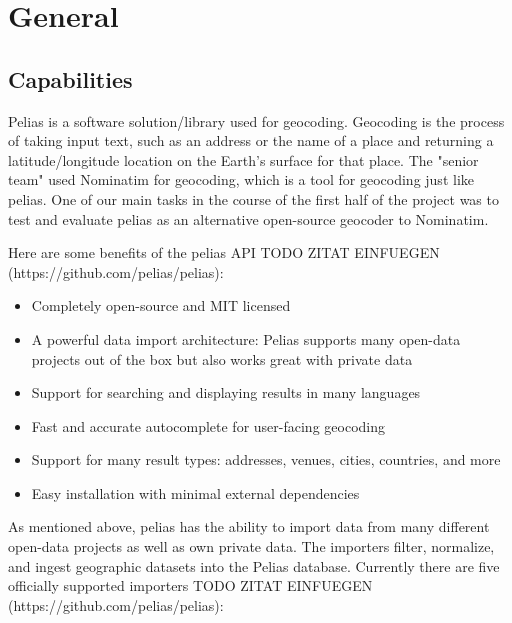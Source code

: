 

\section{General}
\subsection{Capabilities}
Pelias is a software solution/library used for geocoding. Geocoding is the process of taking input text, such as an address or the name of a place and returning a latitude/longitude location on the Earth's surface for that place.
The "senior team" used Nominatim for geocoding, which is a tool for geocoding just like pelias. One of our main tasks  in the course of the first half of the project was to test and evaluate pelias as an alternative open-source geocoder to Nominatim.

Here are some benefits of the pelias API TODO ZITAT EINFUEGEN (https://github.com/pelias/pelias):
\begin{itemize}
\item Completely open-source and MIT licensed
\item A powerful data import architecture: Pelias supports many open-data projects out of the box but also works great with private data
\item Support for searching and displaying results in many languages
\item Fast and accurate autocomplete for user-facing geocoding
\item Support for many result types: addresses, venues, cities, countries, and more
\item Easy installation with minimal external dependencies
\end{itemize}

As mentioned above, pelias has the ability to import data from many different open-data projects as well as own private data. The importers filter, normalize, and ingest geographic datasets into the Pelias database. Currently there are five officially supported importers TODO ZITAT EINFUEGEN (https://github.com/pelias/pelias):

